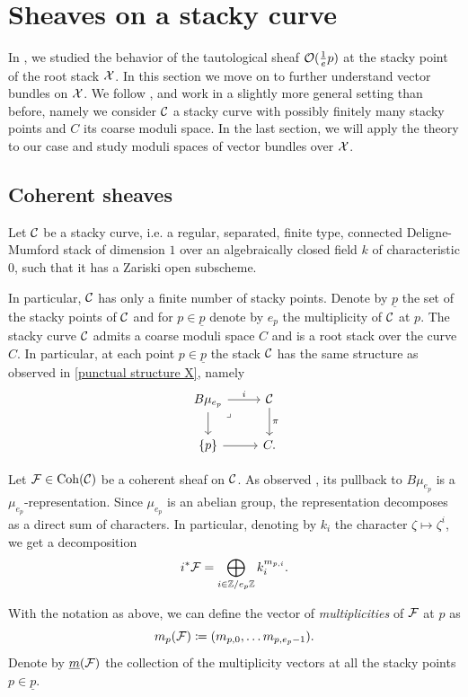 \section{Sheaves on a stacky curve}

In , we studied the behavior of the tautological sheaf $\mathcal{O}(\tfrac{1}{e}p)$ at the stacky point of the root stack $\mathcal{X}$. In this section we move on to further understand vector bundles on $\mathcal{X}$. We follow \cite[]{Taams}, and work in a slightly more general setting than before, namely we consider $\mathcal{C}$ a stacky curve with possibly finitely many stacky points and $C$ its coarse moduli space. In the last section, we will apply the theory to our case and study moduli spaces of vector bundles over $\mathcal{X}$.

\subsection{Coherent sheaves} \label{subsection: coherent sheaves}

Let $\mathcal{C}$ be a stacky curve, i.e. a regular, separated, finite type, connected Deligne-Mumford stack of dimension $1$ over an algebraically closed field $k$ of characteristic $0$, such that it has a Zariski open subscheme.

In particular, $\mathcal{C}$ has only a finite number of stacky points. Denote by $\underline{p}$ the set of the stacky points of $\mathcal{C}$ and for $p \in \underline{p}$ denote by $e_p$ the multiplicity of $\mathcal{C}$ at $p$. The stacky curve $\mathcal{C}$ admits a coarse moduli space $C$ and is a root stack over the curve $C$. In particular, at each point $p \in \underline{p}$ the stack $\mathcal{C}$ has the same structure as observed in \eqref{punctual structure X}, namely
\[\begin{tikzcd}
	{B\mu_{e_p}} & \Cc \\
	{\{ p \}} & C.
	\arrow["i", from=1-1, to=1-2]
	\arrow[from=1-1, to=2-1]
	\arrow["\lrcorner"{anchor=center, pos=0.125}, draw=none, from=1-1, to=2-2]
	\arrow["\pi", from=1-2, to=2-2]
	\arrow[from=2-1, to=2-2]
\end{tikzcd}\]

Let $\mathcal{F} \in \operatorname{Coh}(\mathcal{C})$ be a coherent sheaf on $\mathcal{C}$. As observed , its pullback to $B\mu_{e_p}$ is a $\mu_{e_p}$-representation. Since $\mu_{e_p}$ is an abelian group, the representation decomposes as a direct sum of characters. In particular, denoting by $k_i$ the character $\zeta \mapsto \zeta^i$, we get a decomposition
\[
i^* \mathcal{F} = \bigoplus_{i \in \mathbb{Z} / e_p \mathbb{Z}} k_i^{m_{p,i}}.
\]
\begin{defi}\cite[Definition 1.2.7]{Taams}
With the notation as above, we can define the vector of \textit{multiplicities} of $\mathcal{F}$ at $p$ as
\[
m_p(\mathcal{F}) \coloneqq (m_{p,0}, \dots m_{p, e_p-1}).
\]
Denote by $\underline{m}(\mathcal{F})$ the collection of the multiplicity vectors at all the stacky points $p \in \underline{p}$.
\end{defi}

